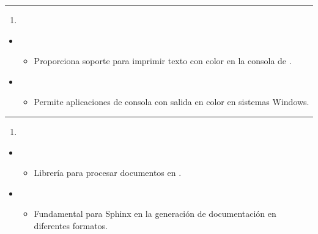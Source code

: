 \documentclass[a4paper,10pt,spanish]{sphinxmanual}
\begin{document}
\bigskip\hrule\bigskip

\begin{enumerate}
%
\setcounter{enumi}{4}
\item {} 
\sphinxAtStartPar
{}

\end{enumerate}
\begin{itemize}
\item {} 
\sphinxAtStartPar
{}
\begin{itemize}
\item {} 
\sphinxAtStartPar
Proporciona soporte para imprimir texto con color en la consola de .

\end{itemize}

\item {} 
\sphinxAtStartPar
{}
\begin{itemize}
\item {} 
\sphinxAtStartPar
Permite aplicaciones de consola con salida en color en sistemas Windows.

\end{itemize}

\end{itemize}


\bigskip\hrule\bigskip

\begin{enumerate}
%
\setcounter{enumi}{5}
\item {} 
\sphinxAtStartPar
{}

\end{enumerate}
\begin{itemize}
\item {} 
\sphinxAtStartPar
{}
\begin{itemize}
\item {} 
\sphinxAtStartPar
Librería para procesar documentos en .

\end{itemize}

\item {} 
\sphinxAtStartPar
{}
\begin{itemize}
\item {} 
\sphinxAtStartPar
Fundamental para Sphinx en la generación de documentación en diferentes formatos.

\end{itemize}

\end{itemize}
\end{document}
